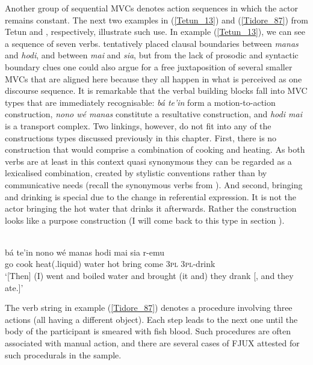 Another group of sequential MVCs denotes action sequences in which the actor remains constant. The next two examples in (\ref{Tetun_13}) and (\ref{Tidore_87}) from Tetun and , respectively, illustrate such use. In example (\ref{Tetun_13}), we can see a sequence of seven verbs. \citet{vanklinken1999grammar} tentatively placed clausal boundaries between \textit{manas} and \textit{hodi}, and between \textit{mai} and \textit{sia}, but from the lack of prosodic and syntactic boundary clues one could also argue for a free juxtaposition of several smaller MVCs that are aligned here because they all happen in what is perceived as one discourse sequence. It is remarkable that the verbal building blocks fall into MVC types that are immediately recognisable: \textit{bá te'in} form a motion-to-action construction, \textit{nono wé manas} constitute a resultative construction, and \textit{hodi mai} is a transport complex. Two linkings, however, do not fit into any of the constructions types discussed previously in this chapter. First, there is no construction that would comprise a combination of cooking and heating. As both verbs are at least in this context quasi synonymous they can be regarded as a lexicalised combination, created by stylistic conventions rather than by communicative needs (recall the synonymous verbs from ). And second, bringing and drinking is special due to the change in referential expression. It is not the actor bringing the hot water that drinks it afterwards. Rather the construction looks like a purpose construction (I will come back to this type in section ). 

\ea \label{Tetun_13}
\\
\gll bá te'in nono wé manas hodi mai sia r-emu \\
go cook heat(.liquid) water hot bring come 3\textsc{pl} 3\textsc{pl}-drink \\
\glft `[Then] (I) went and boiled water and brought (it and) they drank [, and they ate.]'\\ 
\z

The verb string in example (\ref{Tidore_87}) denotes a procedure involving three actions (all having a different object). Each step leads to the next one until the body of the participant is smeared with fish blood. Such procedures are often associated with manual action, and there are several cases of FJUX attested for such procedurals in the sample.

